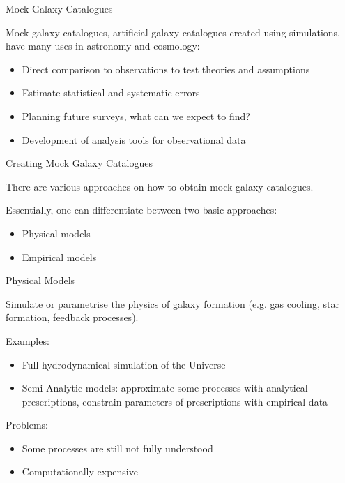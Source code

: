 \begin{frame}{Mock Galaxy Catalogues}
    
    Mock galaxy catalogues, artificial galaxy catalogues created using simulations, have many uses in astronomy and cosmology:
    \begin{itemize}
        \item Direct comparison to observations to test theories and assumptions
        \item Estimate statistical and systematic errors
        \item Planning future surveys, what can we expect to find?
        \item Development of analysis tools for observational data
    \end{itemize}
    
\end{frame}

\begin{frame}{Creating Mock Galaxy Catalogues}
    
    There are various approaches on how to obtain mock galaxy catalogues.
    
    Essentially, one can differentiate between two basic approaches:
    
    \begin{itemize}
        \item Physical models
        \item Empirical models
    \end{itemize}
    
\end{frame}


\begin{frame}{Physical Models}
    
    Simulate or parametrise the physics of galaxy formation (e.g. gas cooling, star formation, feedback processes).
    
    Examples: 
    \begin{itemize}
        \item Full hydrodynamical simulation of the Universe
        \item Semi-Analytic models: approximate some processes with analytical prescriptions, constrain parameters of prescriptions with empirical data
    \end{itemize}
    
    Problems:
    \begin{itemize}
        \item Some processes are still not fully understood
        \item Computationally expensive
    \end{itemize}
    
\end{frame}

